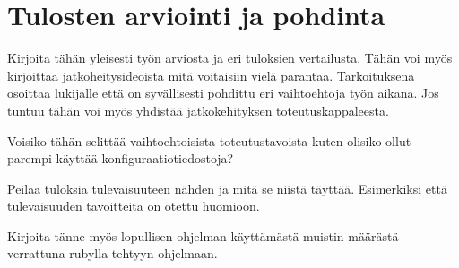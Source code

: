\chapter{Tulosten arviointi ja pohdinta}
\begin{it}
Kirjoita tähän yleisesti työn arviosta ja eri tuloksien vertailusta. Tähän voi myös kirjoittaa jatkoheitysideoista mitä voitaisiin vielä parantaa. Tarkoituksena osoittaa lukijalle että on syvällisesti pohdittu eri vaihtoehtoja työn aikana. Jos tuntuu tähän voi myös yhdistää jatkokehityksen toteutuskappaleesta.

Voisiko tähän selittää vaihtoehtoisista toteutustavoista kuten olisiko ollut parempi käyttää konfiguraatiotiedostoja?

Peilaa tuloksia tulevaisuuteen nähden ja mitä se niistä täyttää. Esimerkiksi että tulevaisuuden tavoitteita on otettu huomioon.

Kirjoita tänne myös lopullisen ohjelman käyttämästä muistin määrästä verrattuna rubylla tehtyyn ohjelmaan.
\end{it}
